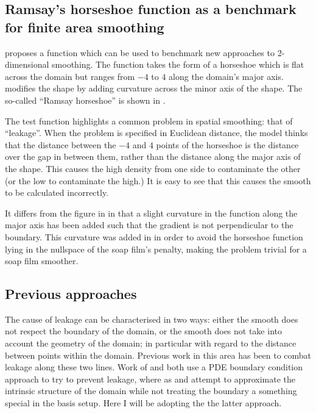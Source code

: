 \subsection{Ramsay's horseshoe function as a benchmark for finite area smoothing}

\cite{ramsay} proposes a function which can be used to benchmark new approaches to 2-dimensional smoothing. The function takes the form of a horseshoe which is flat across the domain but ranges from $-4$ to $4$ along the domain's major axis. \cite{soap} modifies the shape by adding curvature across the minor axis of the shape. The so-called ``Ramsay horseshoe'' is shown in .

The test function highlights a common problem in spatial smoothing: that of ``leakage''. When the problem is specified in Euclidean distance, the model thinks that the distance between the $-4$ and $4$ points of the horseshoe is the distance over the gap in between them, rather than the distance along the major axis of the shape. This causes the high density from one side to contaminate the other (or the low to contaminate the high.) It is easy to see that this causes the smooth to be calculated incorrectly.

It differs from the figure in \cite{ramsay} in that a slight curvature in the function along the major axis has been added such that the gradient is not perpendicular to the boundary. This curvature was added in \cite{soap}  in order to avoid the horseshoe function lying in the nullspace of the soap film's penalty, making the problem trivial for a soap film smoother.
		
\subsection{Previous approaches}

The cause of leakage can be characterised in two ways: either the smooth does not respect the boundary of the domain, or the smooth does not take into account the geometry of the domain; in particular with regard to the distance between points within the domain. Previous work in this area has been to combat leakage along these two lines. Work of \cite{ramsay} and \cite{soap} both use a PDE boundary condition approach to try to prevent leakage, where as \cite{wangranalli} and \cite{eilerstalk}  attempt to approximate the intrinsic structure of the domain while not treating the boundary a something special in the basis setup. Here I will be adopting the the latter approach.


